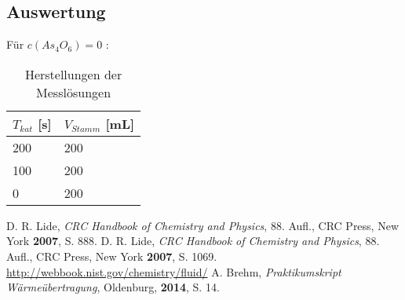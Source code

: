 \documentclass{article}
\begin{document}
\begin{onehalfspace}
\section{Auswertung}
Für $c(As_4O_6)= 0$ :
\begin{table}[ht!]
  \centering
 \begin{tabularx}{\textwidth}{XX}
$T_{kat}$ [\si{\second}] & $V_{Stamm}$ [\si{\milli\liter}]    \\
\hline
\rowcolor{LightCyan}
 200 & 200\\
 100 & 200\\
\rowcolor{LightCyan}
 0 & 200\\
\end{tabularx}
  \caption{Herstellungen der Messlösungen}
\end{table}

\begin{thebibliography}{}
D. R. Lide, \textit{CRC Handbook of Chemistry and Physics}, 88. Aufl., CRC Press, New York \textbf{2007}, S. 888.
D. R. Lide, \textit{CRC Handbook of Chemistry and Physics}, 88. Aufl., CRC Press, New York \textbf{2007}, S. 1069.
\url{http://webbook.nist.gov/chemistry/fluid/}
A. Brehm, \textit{Praktikumskript Wärmeübertragung}, Oldenburg, \textbf{2014},  S. 14.
\end{thebibliography}
\end{onehalfspace}
\end{document}

